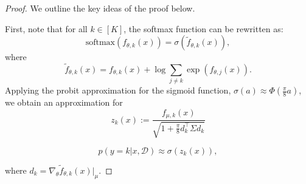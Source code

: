\documentclass{article}
\begin{document}
\begin{proof}
We outline the key ideas of the proof below.

First, note that for all \( k \in [K] \), the softmax function can be rewritten as:
\begin{equation}
    \text{softmax}(f_{\theta,k}(x)) = \sigma(\tilde{f}_{\theta,k}(x)),
\end{equation}
where
\begin{equation}
    \tilde{f}_{\theta,k}(x) = f_{\theta,k}(x) + \log \sum_{j\neq k} \exp(f_{\theta, j}(x)).
\end{equation}
Applying the probit approximation for the sigmoid function, \( \sigma(a) \approx \Phi(\frac{\pi}{8}a) \), we obtain an approximation for 
\begin{equation}
    \label{zk_definition}
    z_k(x) := \frac{f_{\mu,k}(x)}{\sqrt{1+\frac{\pi}{8}d_k^{\intercal}\Sigma d_k}}
\end{equation}

\begin{equation}
    \label{softmax_approx}
    p (y = k | x, \mathcal{D}) \approx \sigma\left(z_k(x)\right),
\end{equation}

where \( d_k = \nabla_{\theta} \tilde{f}_{\theta,k}(x)|_{\mu} \).


\end{proof}
\end{document}
